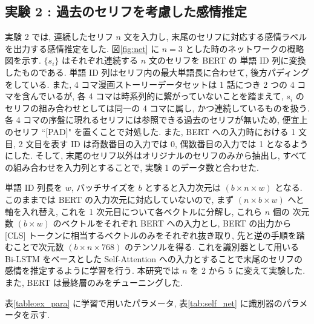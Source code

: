 \documentclass[twocolumn]{jarticle}     %
\begin{document}
\subsection{\small{実験 2 : 過去のセリフを考慮した感情推定}}
実験 2 では, 連続したセリフ $n$ 文を入力し, 末尾のセリフに対応する感情ラベルを出力する感情推定をした.
図\ref{fig:net} に $n = 3$ とした時のネットワークの概略図を示す. $\{s_i\}$ はそれぞれ連続する $n$ 文のセリフを BERT の 単語 ID 列に変換したものである. 単語 ID 列はセリフ内の最大単語長に合わせて, 後方パディングをしている. また, 4 コマ漫画ストーリーデータセットは 1 話につき 2 つの 4 コマを含んでいるが, 各 4 コマは時系列的に繋がっていないことを踏まえて, ${s_i}$ のセリフの組み合わせとしては同一の 4 コマに属し, かつ連続しているものを扱う. 各 4 コマの序盤に現れるセリフには参照できる過去のセリフが無いため, 便宜上のセリフ ``$[$PAD$]$" を置くことで対処した. また, BERT への入力時における 1 文目, 2 文目を表す ID は奇数番目の入力では 0, 偶数番目の入力では 1 となるようにした. そして, 末尾のセリフ以外はオリジナルのセリフのみから抽出し, すべての組み合わせを入力列とすることで, 実験 1 のデータ数と合わせた.

単語 ID 列長を $w$, バッチサイズを $b$ とすると入力次元は $(b \times n \times w)$ となる. このままでは BERT の入力次元に対応していないので, まず $(n \times b \times w)$ へと軸を入れ替え, これを 1 次元目について各ベクトルに分解し, これら $n$ 個の 次元数 $(b \times w)$ のベクトルをそれぞれ BERT への入力とし, BERT の出力から [CLS] トークンに相当するベクトルのみをそれぞれ抜き取り, 先と逆の手順を踏むことで次元数 $(b \times n \times 768)$ のテンソルを得る. これを識別器として用いる Bi-LSTM をベースとした Self-Attention への入力とすることで末尾のセリフの感情を推定するように学習を行う. 本研究では $n$ を 2 から 5 に変えて実験した. また, BERT は最終層のみをチューニングした.

表\ref{table:ex_para} に学習で用いたパラメータ, 表\ref{tab:self_net} に識別器のパラメータを示す.
\end{document}
